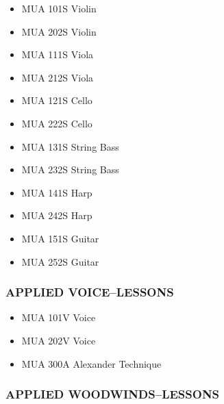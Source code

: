 \documentclass[
  letterpaper,
]{scrbook}
\providecommand{\tightlist}{%
  \setlength{\itemsep}{0pt}\setlength{\parskip}{0pt}}
\begin{document}
\begin{itemize}
\tightlist
\item
  MUA 101S Violin\\
\item
  MUA 202S Violin\\
\item
  MUA 111S Viola\\
\item
  MUA 212S Viola\\
\item
  MUA 121S Cello\\
\item
  MUA 222S Cello\\
\item
  MUA 131S String Bass\\
\item
  MUA 232S String Bass\\
\item
  MUA 141S Harp\\
\item
  MUA 242S Harp\\
\item
  MUA 151S Guitar\\
\item
  MUA 252S Guitar
\end{itemize}

\subsubsection{APPLIED VOICE--LESSONS}\label{applied-voicelessons}

\begin{itemize}
\tightlist
\item
  MUA 101V Voice\\
\item
  MUA 202V Voice\\
\item
  MUA 300A Alexander Technique
\end{itemize}

\subsubsection{APPLIED
WOODWINDS--LESSONS}\label{applied-woodwindslessons}
\end{document}
